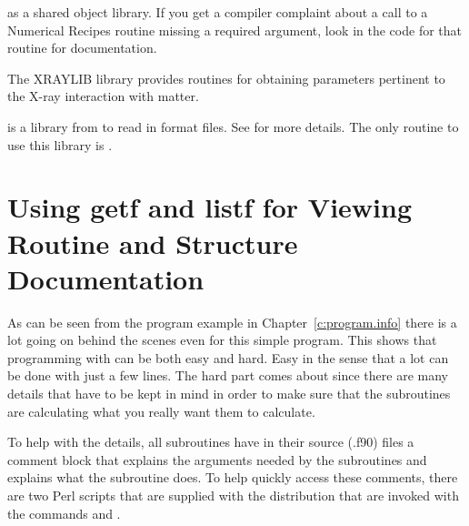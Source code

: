 {{{{{{\begin{description}
as a shared object library. If you get a compiler complaint about a call
to a Numerical Recipes routine missing a required argument, look in the code
for that routine for documentation.
%
  \item[xraylib] \Newline
The XRAYLIB library provides routines for obtaining parameters
pertinent to the X-ray interaction with matter.
%
  \item[xsif] \Newline
{} is a library from  to read in  format files. See 
 for more details. The only
\bmad routine to use this library is .
\end{description}

\section{Using getf and listf for Viewing Routine and Structure Documentation}
\label{s:getf}

As can be seen from the program example in Chapter~\ref{c:program.info}
there is a lot going on behind the scenes even for this
simple program. This shows that programming with \bmad can be both easy
and hard. Easy in the sense that a lot can be done with just a few
lines. The hard part comes about since there are many details that
have to be kept in mind in order to make sure that the subroutines
are calculating what you really want them to calculate.

To help with the details, all \bmad subroutines have in their source (.f90)
files a comment block that explains the arguments needed by the
subroutines and explains what the subroutine does. To help quickly
access these comments, there are two Perl scripts that are supplied
with the \bmad distribution that are invoked with the commands
 and .

}}}}}}
